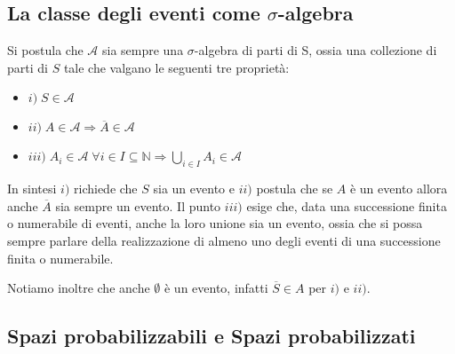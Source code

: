 \subsection{La classe degli eventi come $\sigma$-algebra}

\begin{flushleft}

Si postula che $\mathcal{A}$ sia sempre una $\sigma$-algebra di parti di S, ossia una 
collezione di parti di $S$ tale che valgano le seguenti tre proprietà:

\begin{itemize}
\item{$i) \; S \in \mathcal{A}$}
\item{$ii) \; A \in \mathcal{A} \Rightarrow \overline{A} \in \mathcal{A}$}
\item{$iii) \; A_i \in \mathcal{A} \; \forall i \in I \subseteq \mathbb{N} \Rightarrow 
\bigcup_{i \in I} A_i \in \mathcal{A}$}
\end{itemize}

In sintesi $i)$ richiede che $S$ sia un evento e $ii)$ postula che se $A$ è un evento allora 
anche $\overline{A}$ sia sempre un evento. Il punto $iii)$ esige che, data una successione 
finita o numerabile di eventi, anche la loro unione sia un evento, ossia che si possa sempre
parlare della realizzazione di almeno uno degli eventi di una successione finita o numerabile.

Notiamo inoltre che anche $\emptyset$ è un evento, infatti $\overline{S} \in A$ per $i)$ e 
$ii)$.

\end{flushleft}

\subsection{Spazi probabilizzabili e Spazi probabilizzati}

